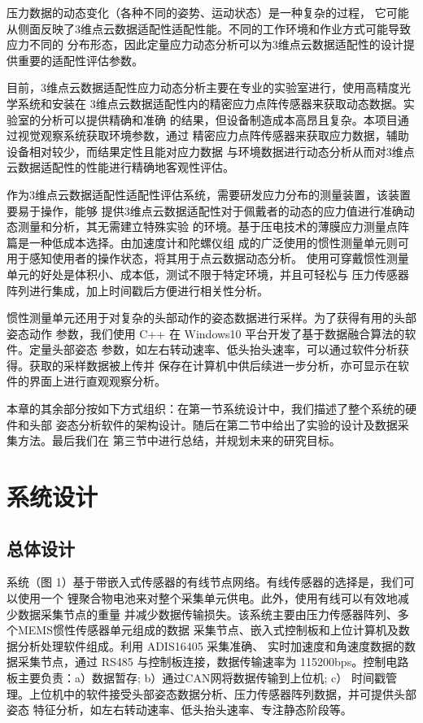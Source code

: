 \documentclass[a4paper,12pt]{ctexbook}	%
\begin{document}
{\fangsong 压力数据的动态变化（各种不同的姿势、运动状态）是一种复杂的过程，
它可能从侧面反映了3维点云数据适配性适配性能。不同的工作环境和作业方式可能导致应力不同的
分布形态，因此定量应力动态分析可以为3维点云数据适配性的设计提供重要的适配性评估参数。}

{\songti 
目前，3维点云数据适配性应力动态分析主要在专业的实验室进行，使用高精度光学系统和安装在
3维点云数据适配性内的精密应力点阵传感器来获取动态数据。实验室的分析可以提供精确和准确
的结果，但设备制造成本高昂且复杂。本项目通过视觉观察系统获取环境参数，通过
精密应力点阵传感器来获取应力数据，辅助设备相对较少，而结果定性且能对应力数据
与环境数据进行动态分析从而对3维点云数据适配性的性能进行精确地客观性评估。

作为3维点云数据适配性适配性评估系统，需要研发应力分布的测量装置，该装置要易于操作，能够
提供3维点云数据适配性对于佩戴者的动态的应力值进行准确动态测量和分析，其无需建立特殊实验
的环境。基于压电技术的薄膜应力测量点阵篇是一种低成本选择。由加速度计和陀螺仪组
成的广泛使用的惯性测量单元则可用于感知使用者的操作状态，将其用于点云数据动态分析。
使用可穿戴惯性测量单元的好处是体积小、成本低，测试不限于特定环境，并且可轻松与
压力传感器阵列进行集成，加上时间戳后方便进行相关性分析。

惯性测量单元还用于对复杂的头部动作的姿态数据进行采样。为了获得有用的头部姿态动作
参数，我们使用 C++ 在 Windows10 平台开发了基于数据融合算法的软件。定量头部姿态
参数，如左右转动速率、低头抬头速率，可以通过软件分析获得。获取的采样数据被上传并
保存在计算机中供后续进一步分析，亦可显示在软件的界面上进行直观观察分析。

本章的其余部分按如下方式组织：在第一节系统设计中，我们描述了整个系统的硬件和头部
姿态分析软件的架构设计。随后在第二节中给出了实验的设计及数据采集方法。最后我们在
第三节中进行总结，并规划未来的研究目标。
}

\section{系统设计}


\subsection{总体设计}

{\songti 
系统（图 1）基于带嵌入式传感器的有线节点网络。有线传感器的选择是，我们可以使用一个
锂聚合物电池来对整个采集单元供电。此外，使用有线可以有效地减少数据采集节点的重量
并减少数据传输损失。该系统主要由压力传感器阵列、多个MEMS惯性传感器单元组成的数据
采集节点、嵌入式控制板和上位计算机及数据分析处理软件组成。利用 ADIS16405 采集准确、
实时加速度和角速度数据的数据采集节点，通过 RS485 与控制板连接，数据传输速率为
115200bps。控制电路板主要负责：a）数据暂存; b）通过CAN网将数据传输到上位机; c）
时间戳管理。上位机中的软件接受头部姿态数据分析、压力传感器阵列数据，并可提供头部姿态
特征分析，如左右转动速率、低头抬头速率、专注静态阶段等。
}
\end{document}
